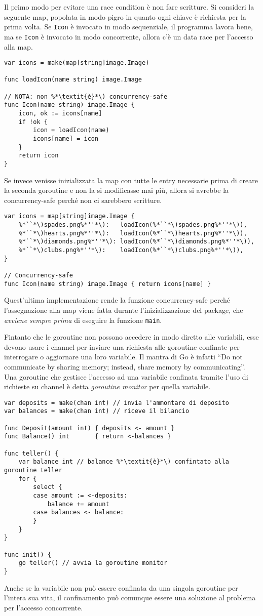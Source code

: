 Il primo modo per evitare una race condition è non fare scritture.
Si consideri la seguente map, popolata in modo pigro in quanto ogni chiave è richiesta per la prima volta.
Se \verb|Icon| è invocato in modo sequenziale, il programma lavora bene, ma se \verb|Icon| è invocato in modo concorrente, allora c'è un data race per l'accesso alla map.
\begin{lstlisting}[frame=single, label={lst:lstlisting9-1.4}]
var icons = make(map[string]image.Image)

func loadIcon(name string) image.Image

// NOTA: non %*\textit{è}*\) concurrency-safe
func Icon(name string) image.Image {
    icon, ok := icons[name]
    if !ok {
        icon = loadIcon(name)
        icons[name] = icon
    }
    return icon
}
\end{lstlisting}
Se invece venisse inizializzata la map con tutte le entry necessarie prima di creare la seconda goroutine e non la si modificasse mai più, allora si avrebbe la concurrency-safe perché non ci sarebbero scritture.
\begin{lstlisting}[frame=single, label={lst:lstlisting9-1.5}]
var icons = map[string]image.Image {
    %*``*\)spades.png%*''*\):   loadIcon(%*``*\)spades.png%*''*\)),
    %*``*\)hearts.png%*''*\):   loadIcon(%*``*\)hearts.png%*''*\)),
    %*``*\)diamonds.png%*''*\): loadIcon(%*``*\)diamonds.png%*''*\)),
    %*``*\)clubs.png%*''*\):    loadIcon(%*``*\)clubs.png%*''*\)),
}

// Concurrency-safe
func Icon(name string) image.Image { return icons[name] }
\end{lstlisting}
Quest'ultima implementazione rende la funzione concurrency-safe perché l'assegnazione alla map viene fatta durante l'inizializzazione del package, che \textit{avviene sempre prima} di eseguire la funzione \verb|main|.

Fintanto che le goroutine non possono accedere in modo diretto alle variabili, esse devono usare i channel per inviare una richiesta alle goroutine confinate per interrogare o aggiornare una loro variabile.
Il mantra di Go è infatti ``Do not communicate by sharing memory;
instead, share memory by communicating''.
Una goroutine che gestisce l'accesso ad una variabile confinata tramite l'uso di richieste su channel è detta \textit{goroutine monitor} per quella variabile.
\begin{lstlisting}[frame=single, label={lst:lstlisting9-1.6}]
var deposits = make(chan int) // invia l'ammontare di deposito
var balances = make(chan int) // riceve il bilancio

func Deposit(amount int) { deposits <- amount }
func Balance() int       { return <-balances }

func teller() {
    var balance int // balance %*\textit{è}*\) confintato alla goroutine teller
    for {
        select {
        case amount := <-deposits:
            balance += amount
        case balances <- balance:
        }
    }
}

func init() {
    go teller() // avvia la goroutine monitor
}
\end{lstlisting}
Anche se la variabile non può essere confinata da una singola goroutine per l'intera sua vita, il confinamento può comunque essere una soluzione al problema per l'accesso concorrente.